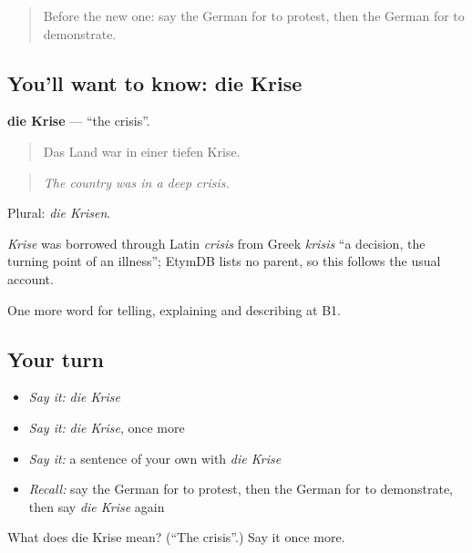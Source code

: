 \label{lesson:GE-C277-krise}



\begin{quote}
Before the new one: say the German for to protest, then the German for to demonstrate.
\end{quote}

\subsection*{You'll want to know: die Krise}
\textbf{die Krise} — \textquotedblleft{}the crisis\textquotedblright{}.

\begin{quote}
Das Land war in einer tiefen Krise.
\end{quote}

\begin{quote}
\emph{The country was in a deep crisis.}
\end{quote}

Plural: \emph{die Krisen}.

\begin{cousinweb}
\emph{Krise} was borrowed through Latin \emph{crisis} from Greek \emph{krisis} \textquotedblleft{}a decision, the turning point of an illness\textquotedblright{}; EtymDB lists no parent, so this follows the usual account.
\end{cousinweb}

\begin{grammarlens}[title={What you've built}]
One more word for telling, explaining and describing at B1.
\end{grammarlens}

\subsection*{Your turn}
\begin{itemize}
\raggedright
  \item \emph{Say it:} \emph{die Krise}
  \item \emph{Say it:} \emph{die Krise}, once more
  \item \emph{Say it:} a sentence of your own with \emph{die Krise}
  \item \emph{Recall:} say the German for to protest, then the German for to demonstrate, then say \emph{die Krise} again
\end{itemize}

\begin{tcolorbox}[breakable,colback=teal!4,colframe=teal!35!black,title={Before you move on}]
What does die Krise mean? (\textquotedblleft{}The crisis\textquotedblright{}.) Say it once more.
\end{tcolorbox}
